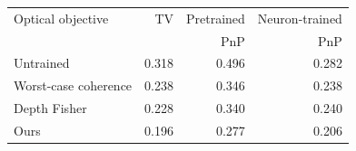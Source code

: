 \begin{tabular}{@{}lrrr@{}}
\toprule
Optical objective & TV & Pretrained & Neuron-trained \\
 & & PnP & PnP \\
\midrule
Untrained & 0.318 & 0.496 & 0.282 \\
Worst-case coherence & 0.238 & 0.346 & 0.238 \\
Depth Fisher & 0.228 & 0.340 & 0.240 \\
Ours & 0.196 & 0.277 & 0.206 \\
\bottomrule
\end{tabular}

